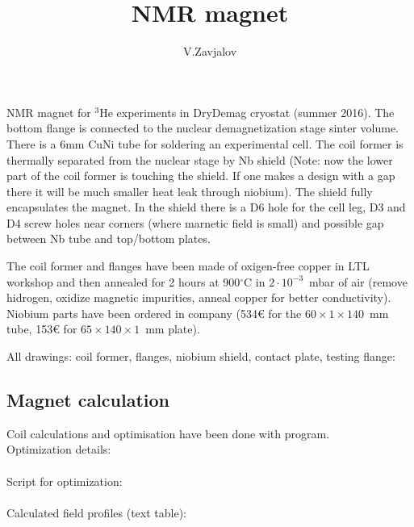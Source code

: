 \documentclass[a4paper]{article}
\title{NMR magnet}
\author{V.Zavjalov}
\begin{document}
\maketitle

NMR magnet for $^3$He experiments in DryDemag cryostat (summer 2016). The bottom flange
is connected to the nuclear demagnetization stage sinter volume. There is
a 6mm CuNi tube for soldering an experimental cell. The coil former is
thermally separated from the nuclear stage by Nb shield (Note: now the
lower part of the coil former is touching the shield. If one makes a
design with a gap there it will be much smaller heat leak through
niobium). The shield fully encapsulates the magnet. In the shield there
is a D6 hole for the cell leg, D3 and D4 screw holes near corners (where
marnetic field is small) and possible gap between Nb tube and top/bottom
plates.


The coil former and flanges have been made of oxigen-free copper in LTL
workshop and then annealed for 2 hours at 900$^\circ$C in
$2\cdot10^{-3}$~mbar of air (remove hidrogen, oxidize magnetic
impurities, anneal copper for better conductivity). Niobium parts have
been ordered in \Firmetal{} company (534\euro{} for the
$60\times1\times140$~mm tube, 153\euro{} for $65\times140\times1$~mm
plate).

All drawings: coil former, flanges, niobium shield, contact plate,
testing flange: 



\subsection*{Magnet calculation}
Coil calculations and optimisation have been done with \MagnettiProg{} program.\\
Optimization details:\\
\\
Script for optimization:\\
\\
Calculated field profiles (text table):\\
\end{document}
